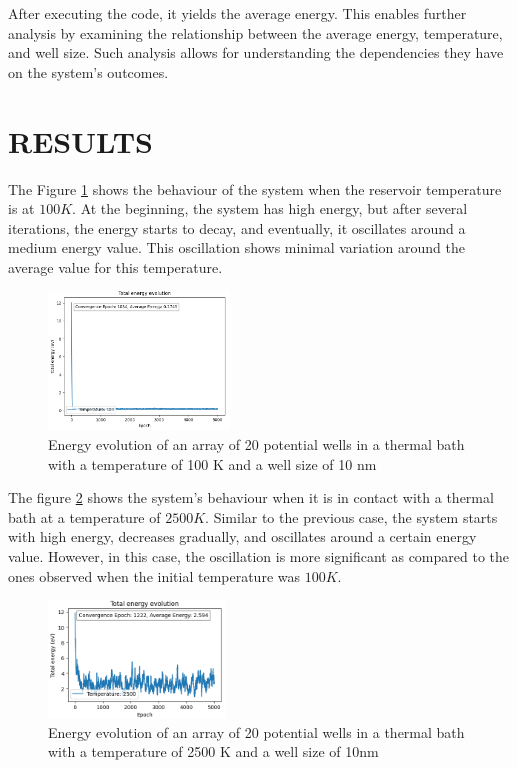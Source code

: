 \documentclass[%
 reprint,
 amsmath,amssymb,
 aps,
]{revtex4-2}
\begin{document}
After executing the code, it yields the average energy. This enables further analysis by examining the relationship between the average energy, temperature, and well size. Such analysis allows for understanding the dependencies they have on the system's outcomes.



\section{RESULTS}
The Figure \ref{fig:T10} shows the behaviour of the system when the reservoir temperature is at $100 K$. At the beginning, the system has high energy, but after several iterations, the energy starts to decay, and eventually, it oscillates around a medium energy value. This oscillation shows minimal variation around the average value for this temperature. 

\begin{figure}[h!]
    \centering    \includegraphics[width=0.43\textwidth]{t100.png} 
    \caption{Energy evolution of an array of 20 potential wells in a thermal bath with a temperature of 100 K and a well size of 10 nm}
    \label{fig:T10}
\end{figure}

The figure \ref{fig:t1800} shows the system's behaviour when it is in contact with a thermal bath at a temperature of $2500K$. Similar to the previous case, the system starts with high energy, decreases gradually, and oscillates around a certain energy value. However, in this case, the oscillation is more significant as compared to the ones observed when the initial temperature was $100K$.
\begin{figure}[h!]
    \centering \includegraphics[width=0.42\textwidth]{T1800.png} 
    \caption{Energy evolution of an array of 20 potential wells in a thermal bath with a temperature of 2500 K and a well size of 10nm}
    \label{fig:t1800}
\end{figure}
\end{document}
